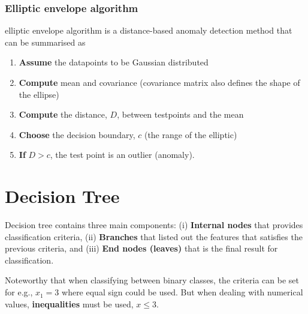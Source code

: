 \documentclass[a4paper,10pt]{article}
\begin{document}
\subsubsection{Elliptic envelope algorithm}
elliptic envelope algorithm is a distance-based anomaly detection method that can be summarised as 
\begin{enumerate}
    \item \textbf{Assume} the datapoints to be Gaussian distributed
    \item \textbf{Compute} mean and covariance (covariance matrix also defines the shape of the ellipse)
    \item \textbf{Compute} the distance, $D$, between testpoints and the mean
    \item \textbf{Choose} the decision boundary, $c$ (the range of the elliptic)
    \item \textbf{If} $D>c$, the test point is an outlier (anomaly). 
\end{enumerate}


\section{Decision Tree}
Decision tree contains three main components: (i) \textbf{Internal nodes} that provides classification criteria, (ii) \textbf{Branches} that listed out the features that satisfies the previous criteria, and (iii) \textbf{End nodes (leaves)} that is the final result for classification. \par

Noteworthy that when classifying between binary classes, the criteria can be set for e.g., $x_1=3$ where equal sign could be used. But when dealing with numerical values, \textbf{inequalities} must be used, $x\leq3$.
\end{document}
